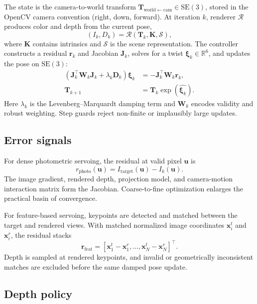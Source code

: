 \documentclass[10pt,twocolumn]{article}
\newcommand{\SEthree}{\mathrm{SE}(3)}
\newcommand{\Tworldcam}{\mathbf{T}_{\mathrm{world}\leftarrow\mathrm{cam}}}
\begin{document}
The state is the camera-to-world transform $\Tworldcam\in\SEthree$, stored in
the OpenCV camera convention (right, down, forward). At iteration $k$, renderer
$\mathcal{R}$ produces color and depth from the current pose,
\begin{equation}
  (I_k, D_k) = \mathcal{R}(\mathbf{T}_k, \mathbf{K}, \mathcal{S}),
\end{equation}
where $\mathbf{K}$ contains intrinsics and $\mathcal{S}$ is the scene
representation. The controller constructs a residual $\mathbf{r}_k$ and
Jacobian $\mathbf{J}_k$, solves for a twist $\boldsymbol{\xi}_k\in\mathbb{R}^6$,
and updates the pose on $\SEthree$:
\begin{align}
  (\mathbf{J}_k^\top\mathbf{W}_k\mathbf{J}_k + \lambda_k\mathbf{D}_k)
  \boldsymbol{\xi}_k
    &= -\mathbf{J}_k^\top\mathbf{W}_k\mathbf{r}_k, \\
  \mathbf{T}_{k+1}
    &= \mathbf{T}_k\exp(\widehat{\boldsymbol{\xi}_k}).
\end{align}
Here $\lambda_k$ is the Levenberg--Marquardt damping term and
$\mathbf{W}_k$ encodes validity and robust weighting. Step guards reject
non-finite or implausibly large updates.

\subsection{Error signals}

For dense photometric servoing, the residual at valid pixel $\mathbf{u}$ is
\begin{equation}
  r_{\mathrm{photo}}(\mathbf{u}) =
  I_{\mathrm{target}}(\mathbf{u}) - I_k(\mathbf{u}).
\end{equation}
The image gradient, rendered depth, projection model, and camera-motion
interaction matrix form the Jacobian. Coarse-to-fine optimization enlarges the
practical basin of convergence.

For feature-based servoing, keypoints are detected and matched between the
target and rendered views. With matched normalized image coordinates
$\mathbf{x}^{t}_i$ and $\mathbf{x}^{r}_i$, the residual stacks
\begin{equation}
  \mathbf{r}_{\mathrm{feat}} =
  \left[\mathbf{x}^{t}_1-\mathbf{x}^{r}_1,\ldots,
  \mathbf{x}^{t}_N-\mathbf{x}^{r}_N\right]^\top.
\end{equation}
Depth is sampled at rendered keypoints, and invalid or geometrically
inconsistent matches are excluded before the same damped pose update.

\subsection{Depth policy}
\end{document}
